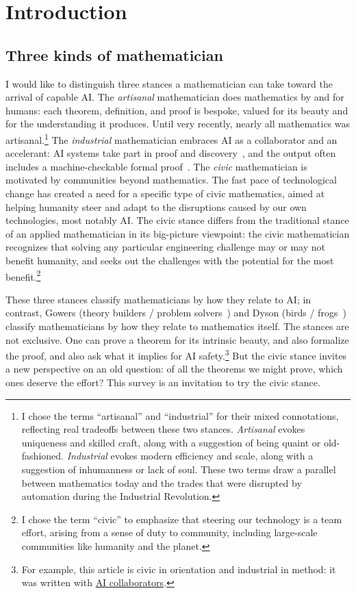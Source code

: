 \section{Introduction}
\label{sec:intro}

\subsection{Three kinds of mathematician}

I would like to distinguish three stances a mathematician can take toward the arrival of capable AI. The \emph{artisanal} mathematician does mathematics by and for humans: each theorem, definition, and proof is bespoke, valued for its beauty and for the understanding it produces. Until very recently, nearly all mathematics was artisanal.\footnote{I chose the terms ``artisanal'' and ``industrial'' for their mixed connotations, reflecting real tradeoffs between these two stances. \emph{Artisanal} evokes uniqueness and skilled craft, along with a suggestion of being quaint or old-fashioned. \emph{Industrial} evokes modern efficiency and scale, along with a suggestion of inhumanness or lack of soul. These two terms draw a parallel between mathematics today and the trades that were disrupted by automation during the Industrial Revolution.}
The \emph{industrial} mathematician embraces AI as a collaborator and an accelerant: AI systems take part in proof and discovery~\cite{spherepacking2026,openai2026unitdistance,alon2026remarks,sawin2026}, and the output often includes a machine-checkable formal proof~\cite{mathlib2020}.
The \emph{civic} mathematician is motivated by communities beyond mathematics. The fast pace of technological change has created a need for a specific type of civic mathematics, aimed at helping humanity steer and adapt to the disruptions caused by our own technologies, most notably AI. The civic stance differs from the traditional stance of an applied mathematician in its big-picture viewpoint: the civic mathematician recognizes that solving any particular engineering challenge may or may not benefit humanity, and seeks out the challenges with the potential for the most benefit.\footnote{I chose the term ``civic'' to emphasize that steering our technology is a team effort, arising from a sense of duty to community, including large-scale communities like humanity and the planet.}

These three stances classify mathematicians by how they relate to AI; in contrast, Gowers (theory builders / problem solvers~\cite{gowers2000}) and Dyson (birds / frogs~\cite{dyson2009}) classify mathematicians by how they relate to mathematics itself.
The stances are not exclusive. One can prove a theorem for its intrinsic beauty, and also formalize the proof, and also ask what it implies for AI safety.\footnote{For example, this article is civic in orientation and industrial in method: it was written with \hyperref[sec:ai-collaborators]{AI collaborators}.} But the civic stance invites a new perspective on an old question: of all the theorems we might prove, which ones deserve the effort? This survey is an invitation to try the civic stance.

